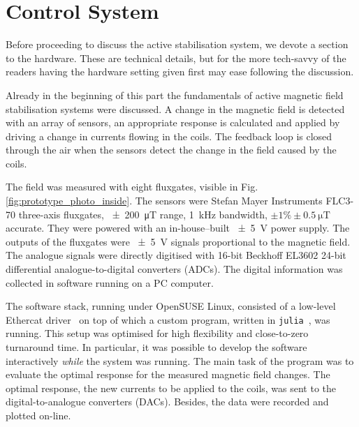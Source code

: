 \section{Control System}
Before proceeding to discuss the active stabilisation system, we devote a section to the hardware. These are technical details, but for the more tech-savvy of the readers having the hardware setting given first may ease following the discussion.

Already in the beginning of this part the fundamentals of active magnetic field stabilisation systems were discussed. A change in the magnetic field is detected with an array of sensors, an appropriate response is calculated and applied by driving a change in currents flowing in the coils. The feedback loop is closed through the air when the sensors detect the change in the field caused by the coils.

The field was measured with eight fluxgates, visible in Fig.\,\ref{fig:prototype_photo_inside}.
The sensors were Stefan Mayer Instruments FLC3-70 three-axis fluxgates, \SI{\pm 200}{\micro\tesla} range, \SI{1}{\kilo\hertz} bandwidth, $\pm 1\% \pm \SI{0.5}{\micro\tesla}$ accurate.
They were powered with an in-house--built \SI{\pm 5}{\volt} power supply. The outputs of the fluxgates were \SI{\pm 5}{\volt} signals proportional to the magnetic field.
The analogue signals were directly digitised with 16-bit Beckhoff EL3602 24-bit differential analogue-to-digital converters (ADCs). The digital information was collected in software running on a PC computer.

The software stack, running under OpenSUSE Linux, consisted of a low-level Ethercat driver~\cite{etherlabcode} on top of which a custom program, written in \texttt{julia}~\cite{julia}, was running.
This setup was optimised for high flexibility and close-to-zero turnaround time. In particular, it was possible to develop the software interactively \emph{while} the system was running. The main task of the program was to evaluate the optimal response for the measured magnetic field changes. The optimal response, the new currents to be applied to the coils, was sent to the digital-to-analogue converters (DACs). Besides, the data were recorded and plotted on-line. 

